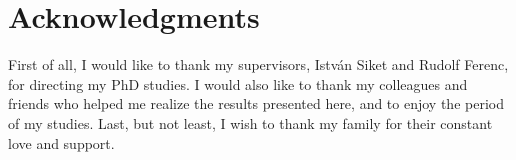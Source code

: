 \chapter*{Acknowledgments}
\markboth{}{}

First of all, I would like to thank my supervisors, István Siket and Rudolf Ferenc, for directing my PhD studies.
I would also like to thank my colleagues and friends who helped me realize the results presented here, and to enjoy the period of my studies.
Last, but not least, I wish to thank my family for their constant love and support.